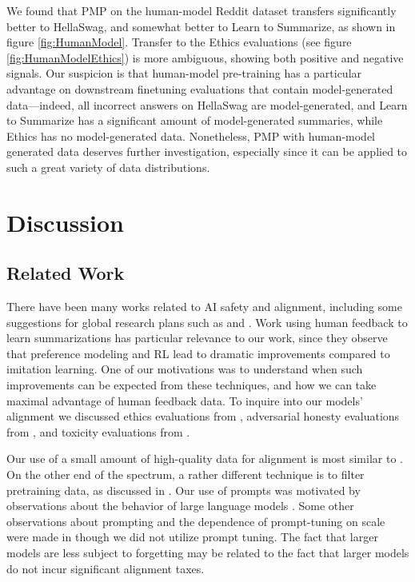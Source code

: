 We found that PMP on the human-model Reddit dataset  transfers significantly better to HellaSwag, and somewhat better to Learn to Summarize, as shown in figure \ref{fig:HumanModel}. Transfer to the Ethics evaluations (see figure \ref{fig:HumanModelEthics}) is more ambiguous, showing both positive and negative signals. Our suspicion is that human-model pre-training has a particular advantage on downstream finetuning evaluations that contain model-generated data---indeed, all incorrect answers on HellaSwag are model-generated, and Learn to Summarize has a significant amount of model-generated summaries, while Ethics has no model-generated data. Nonetheless, PMP with human-model generated data deserves further investigation, especially since it can be applied to such a great variety of data distributions.

\section{Discussion}

\subsection{Related Work}

There have been many works related to AI safety and alignment, including some suggestions for global research plans such as \cite{amodei2016concrete} and \cite{hendrycks2021unsolved}.  Work using human feedback to learn summarizations \cite{stiennon2020learning} has particular relevance to our work, since they observe that preference modeling and RL lead to dramatic improvements compared to imitation learning.  One of our motivations was to understand when such improvements can be expected from these techniques, and how we can take maximal advantage of human feedback data. To inquire into our models' alignment we discussed ethics evaluations from \cite{hendrycks2021aligning}, adversarial honesty evaluations from \cite{lin2021truthfulqa}, and toxicity evaluations from \cite{gehman2020realtoxicityprompts}. 

Our use of a small amount of high-quality data for alignment is most similar to \cite{PALMS}.  On the other end of the spectrum, a rather different technique is to  filter pretraining data, as discussed in \cite{ngo2021mitigating}.  Our use of prompts was motivated by observations about the behavior of large language models \cite{brown2020language}.  Some other observations about prompting and the dependence of prompt-tuning on scale were made in \cite{lester2021power} though we did not utilize prompt tuning.  The fact that larger models are less subject to forgetting \cite{ramasesh2020anatomy} may be related to the fact that larger models do not incur significant alignment taxes.

